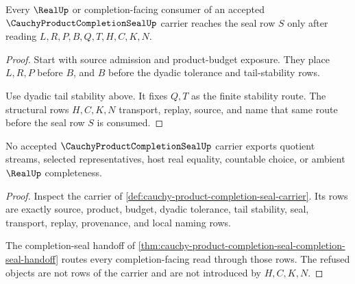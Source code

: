 \begin{theorem}
\label{thm:cauchy-product-completion-seal-completion-seal-handoff}
Every $\RealUp$ or completion-facing consumer of an accepted $\CauchyProductCompletionSealUp$ carrier reaches the seal row $S$ only after reading $L,R,P,B,Q,T,H,C,K,N$.
\end{theorem}
\begin{proof}
Start with source admission and product-budget exposure. They place $L,R,P$ before $B$, and $B$ before the dyadic tolerance and tail-stability rows.

Use dyadic tail stability above. It fixes $Q,T$ as the finite stability route. The structural rows $H,C,K,N$ transport, replay, source, and name that same route before the seal row $S$ is consumed.
\end{proof}

\begin{theorem}
\label{thm:cauchy-product-completion-seal-quotient-choice-refusal}
No accepted $\CauchyProductCompletionSealUp$ carrier exports quotient streams, selected representatives, host real equality, countable choice, or ambient $\RealUp$ completeness.
\end{theorem}
\begin{proof}
Inspect the carrier of \autoref{def:cauchy-product-completion-seal-carrier}. Its rows are exactly source, product, budget, dyadic tolerance, tail stability, seal, transport, replay, provenance, and local naming rows.

The completion-seal handoff of \autoref{thm:cauchy-product-completion-seal-completion-seal-handoff} routes every completion-facing read through those rows. The refused objects are not rows of the carrier and are not introduced by $H,C,K,N$.
\end{proof}



